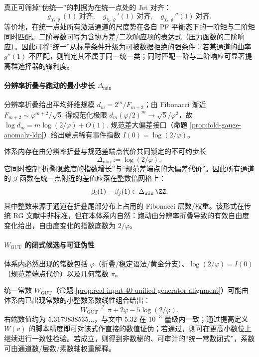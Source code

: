 \begin{proposition}\label{prop:jet-alignment-unification}
真正可筛掉“伪统一”的判据为在统一点处的 Jet 对齐：
\[
g_{\chi,\varrho}(1)\ \text{对齐},\quad
g_{\chi,\varrho}'(1)\ \text{对齐},\quad
g_{\chi,\varrho}''(1)\ \text{对齐}.
\]
等价地，在统一点处所有激活通道的尺度势在各自 PF 平衡态下的一阶矩与二阶矩同时匹配。二阶导数可写为含协方差/二次响应项的表达式（压力函数的二阶响应）。因此可将“统一”从标量条件升级为可被数据拒绝的强条件：若某通道的曲率 \(g''(1)\) 不匹配，则判定其不属于同一统一类；同时匹配一阶与二阶响应可显著提高群选择器的锋利度。
\end{proposition}

\paragraph{分辨率折叠与跑动的最小步长 \(\Delta_{\min}\)}
分辨率折叠给出平均纤维规模 \(d_m=2^m/F_{m+2}\)；由 Fibonacci 渐近 \(F_{m+2}\sim \varphi^{m+2}/\sqrt5\) 得规范化极限 \(d_m(\varphi/2)^m\to\sqrt5/\varphi^2\)，故
\(
\log d_m=m\log(2/\varphi)+O(1).
\)
规范差大偏差接口（命题 \ref{prop:fold-gauge-anomaly-ldp}）给出端点稀有事件指数 \(I(0)=\log(2/\varphi)\)。

\begin{proposition}\label{prop:beta-quantization-step}
体系内存在由分辨率折叠与规范差端点代价共同锁定的不可约步长
\[
\Delta_{\min}:=\log(2/\varphi),
\]
它同时控制“折叠隐藏度的指数增长”与“规范差端点的大偏差代价”。因此所有通道的 \(\beta\) 函数在统一点附近的差值应落在整数倍网格上：
\[
\beta_i(1)-\beta_j(1)\in \Delta_{\min}\,\ZZ,
\]
其中整数来源于通道在折叠尾部分布上占用的 Fibonacci 层数/权重。该形式在传统 RG 文献中非标准，但在本体系内自然：跑动由分辨率折叠导致的有效自由度变化给出，自由度变化的指数底数为 \(2/\varphi\)。
\end{proposition}

\paragraph{\(W_{\mathrm{GUT}}\) 的闭式候选与可证伪性}
体系内必然出现的常数包括 \(\varphi\)（折叠/稳定语法/黄金分支）、\(\log(2/\varphi)=I(0)\)（规范差端点代价）以及几何常数 \(\pi\)。

\begin{conjecture}\label{conj:Wgut-closed-form}
统一常数 \(W_{\mathrm{GUT}}\)（命题 \ref{prop:real-input-40-unified-generator-alignment}）可能由体系内已出现常数的小整数系数线性组合给出：
\[
W_{\mathrm{GUT}}\stackrel{?}{=}\pi+2\varphi-5\log(2/\varphi).
\]
右端数值约为 \(5.3179838535\ldots\)，与文中 \(5.32\) 在 \(10^{-3}\) 量级内一致；通过提高定义 \(W(v)\) 的脚本精度即可对该式作直接的数值证伪；若通过，则可在更高小数位上继续进行一致性检验。若成立，则得到非数秘的、可审计的“统一常数闭式”，系数可由通道数/层数/素数轴权重解释。
\end{conjecture}

